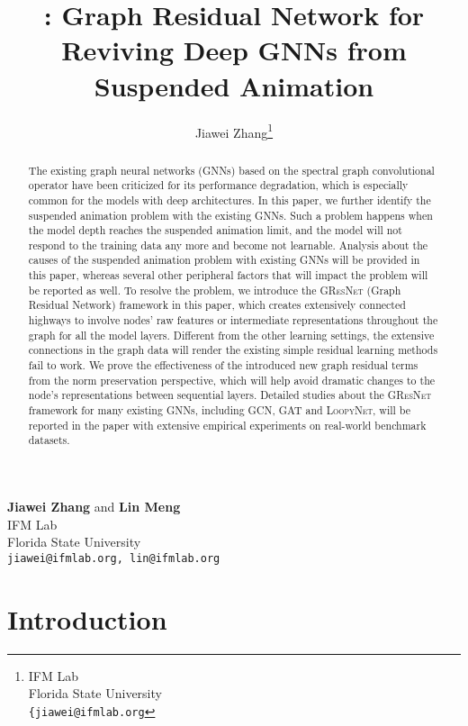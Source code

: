\documentclass{article}
\title{{\gresnet}: Graph Residual Network for Reviving Deep GNNs from Suspended Animation}
\author{Jiawei Zhang\thanks{
IFM Lab\\
Florida State University\\
\texttt{\{jiawei@ifmlab.org}
}
}
\newcommand{\gresnet}{\textsc{GResNet}}
\newcommand{\gcn}{\textsc{GCN}}
\newcommand{\gat}{\textsc{GAT}}
\newcommand{\loopy}{\textsc{LoopyNet}}
\begin{document}
\maketitle

\textbf{Jiawei Zhang} and \textbf{Lin Meng} \\
IFM Lab\\
Florida State University\\
\texttt{jiawei@ifmlab.org, lin@ifmlab.org}\\

\begin{abstract}

The existing graph neural networks (GNNs) based on the spectral graph convolutional operator have been criticized for its performance degradation, which is especially common for the models with deep architectures. In this paper, we further identify the suspended animation problem with the existing GNNs. Such a problem happens when the model depth reaches the suspended animation limit, and the model will not respond to the training data any more and become not learnable. Analysis about the causes of the suspended animation problem with existing GNNs will be provided in this paper, whereas several other peripheral factors that will impact the problem will be reported as well. To resolve the problem, we introduce the {\gresnet} (Graph Residual Network) framework in this paper, which creates extensively connected highways to involve nodes' raw features or intermediate representations throughout the graph for all the model layers. Different from the other learning settings, the extensive connections in the graph data will render the existing simple residual learning methods fail to work. We prove the effectiveness of the introduced new graph residual terms from the norm preservation perspective, which will help avoid dramatic changes to the node's representations between sequential layers. Detailed studies about the {\gresnet} framework for many existing GNNs, including {\gcn}, {\gat} and {\loopy}, will be reported in the paper with extensive empirical experiments on real-world benchmark datasets.

\end{abstract}
\vspace{-15pt}
\section{Introduction}\label{sec:introduction}
\vspace{-8pt}
\end{document}
